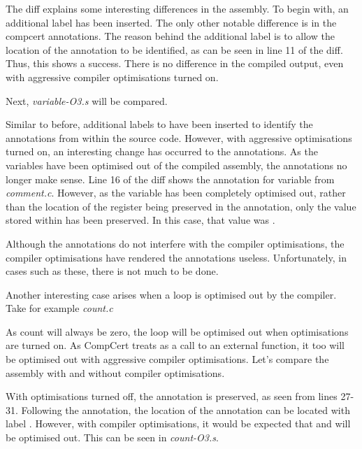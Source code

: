 

The diff explains some interesting differences in the assembly. To begin with, an additional label  has been inserted. The only other notable difference is in the compcert annotations. The reason behind the additional label is to allow the location of the annotation to be identified, as can be seen in line 11 of the diff. Thus, this shows a success. There is no difference in the compiled output, even with aggressive compiler optimisations turned on. 

Next, \textit{variable-O3.s} will be compared.



Similar to before, additional labels  to  have been inserted to identify the annotations from within the source code. However, with aggressive optimisations turned on, an interesting change has occurred to the annotations. As the variables have been optimised out of the compiled assembly, the annotations no longer make sense. Line 16 of the diff shows the annotation for variable  from \textit{comment.c}. However, as the variable has been completely optimised out, rather than the location of the register being preserved in the annotation, only the value stored within  has been preserved. In this case, that value was .

Although the annotations do not interfere with the compiler optimisations, the compiler optimisations have rendered the annotations useless. Unfortunately, in cases such as these, there is not much to be done. 

Another interesting case arises when a loop is optimised out by the compiler. Take for example \textit{count.c}



As count will always be zero, the loop will be optimised out when optimisations are turned on. As CompCert treats  as a call to an external function, it too will be optimised out with aggressive compiler optimisations. Let's compare the assembly with and without compiler optimisations. 



With optimisations turned off, the annotation is preserved, as seen from lines 27-31. Following the annotation, the location of the annotation can be located with label . However, with compiler optimisations, it would be expected that  and  will be optimised out. This can be seen in \textit{count-O3.s}.

